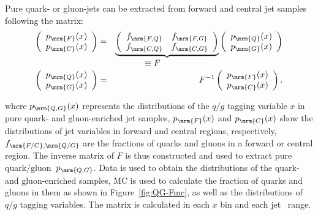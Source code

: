 Pure quark- or gluon-jets can be extracted from forward and central jet samples following the matrix: 
\begin{eqnarray}
	\label{eq:QG-matrix2}
	\left(\begin{array}{c} 
		p_{\mrm{F}}(x)\\ 
		p_{\mrm{C}}(x)\\ 
	\end{array}\right)
	&=&
	\underbrace{
		\left(\begin{array}{cc}
			f_{\mrm{F,Q}}&f_{\mrm{F,G}}\\
			f_{\mrm{C,Q}}&f_{\mrm{C,G}}\\
		\end{array}\right)
	}_{\scalebox{1}{$\equiv F$}}
	\left(\begin{array}{c} 
		p_\mrm{Q}(x)\\ 
		p_\mrm{G}(x)\\ 
	\end{array}\right)
	\\
	\label{eq:QG-invmatrix2}
	\left(\begin{array}{c} 
		p_\mrm{Q}(x)\\ 
		p_\mrm{G}(x)\\ 
	\end{array}\right)
	&=& F^{-1}
	\left(\begin{array}{c} 
		p_{\mrm{F}}(x)\\ 
		p_{\mrm{C}}(x)\\ 
	\end{array}\right).
\end{eqnarray}


where $p_{\mrm{Q,G}}(x)$ represents the distributions of the $q/g$ tagging variable $x$ in pure quark- and gluon-enriched jet samples, 
$p_{\mrm{F}}(x)$ and $p_{\mrm{C}}(x)$ show the distributions of jet variables in forward and central regions, respectively, $f_{\mrm{F/C},\mrm{Q/G}}$ are the fractions of quarks and gluons in a forward or central region. %
The inverse matrix of $F$ is thus constructed and used to extract pure quark/gluon~$p_{\mrm{Q,G}}$. %
Data is used to obtain the distributions of the quark- and gluon-enriched samples, MC is used to calculate the fraction of quarks and gluons in them as shown in Figure~\ref{fig:QG-Fmc}, as well as the distributions of $q/g$ tagging variables. %
The matrix is calculated in each $x$ bin and each jet \pt~range.


